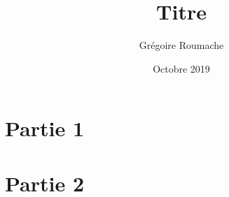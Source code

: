 \documentclass[a4paper]{article}
\title{Titre}
\author{Grégoire Roumache}
\date{Octobre 2019}
\begin{document}
\maketitle





\part{Partie 1}






\part{Partie 2}

\end{document}
